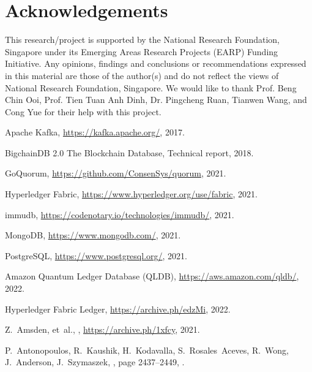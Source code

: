 \documentclass[11pt]{article}
\begin{document}
\section*{Acknowledgements}

This research/project is supported by the National Research Foundation,
Singapore under its Emerging Areas Research Projects (EARP) Funding Initiative.
Any opinions, findings and conclusions or recommendations expressed in this
material are those of the author(s) and do not reflect the views of National
Research Foundation, Singapore. We would like to thank Prof. Beng Chin Ooi,
Prof. Tien Tuan Anh Dinh, Dr. Pingcheng Ruan, Tianwen Wang, and Cong Yue for
their help with this project.

%
%

\begin{thebibliography}{10}

{Apache Kafka},
\newblock \url{https://kafka.apache.org/}, 2017.

{BigchainDB 2.0 The Blockchain Database},
\newblock Technical report, 2018.

{GoQuorum},
\newblock \url{https://github.com/ConsenSys/quorum}, 2021.

{Hyperledger Fabric},
\newblock \url{https://www.hyperledger.org/use/fabric}, 2021.

{immudb},
\newblock \url{https://codenotary.io/technologies/immudb/}, 2021.

{MongoDB},
\newblock \url{https://www.mongodb.com/}, 2021.

{PostgreSQL},
\newblock \url{https://www.postgresql.org/}, 2021.

{Amazon Quantum Ledger Database (QLDB)},
\newblock \url{https://aws.amazon.com/qldb/}, 2022.

{Hyperledger Fabric Ledger},
\newblock \url{https://archive.ph/edzMi}, 2022.

Z.~Amsden,  et~al.,
,
\newblock \url{https://archive.ph/1xfcy}, 2021.

P.~Antonopoulos, R.~Kaushik, H.~Kodavalla, S.~Rosales~Aceves, R.~Wong,
  J.~Anderson,  J.~Szymaszek,
, page 2437–2449,
.


\end{thebibliography}
\end{document}

